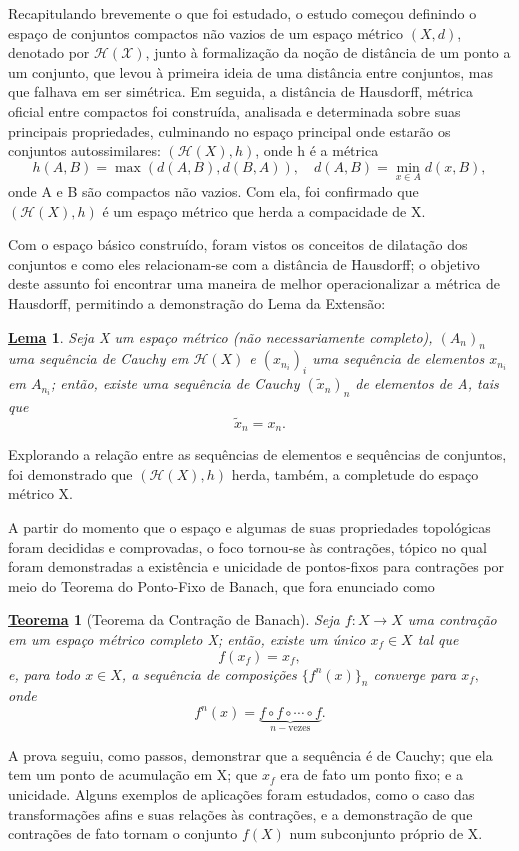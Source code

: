 \documentclass[12pt, a4paper]{article}
\newtheorem*{theorem*}{\underline{Teorema}}
\newtheorem*{lemma*}{\underline{Lema}}
\theoremstyle{definition}
\begin{document}
Recapitulando brevemente o que foi estudado, o estudo começou definindo o espaço de conjuntos compactos não vazios de um espaço métrico \((X, d)\), denotado por \(\mathcal{H(X)}\), junto à formalização da noção de distância de um ponto a um conjunto, que levou à primeira ideia de uma distância entre conjuntos, mas que falhava em ser simétrica.
Em seguida, a distância de Hausdorff, métrica oficial entre compactos foi construída, analisada e determinada sobre suas principais propriedades, culminando no espaço principal onde estarão os conjuntos autossimilares: \((\mathcal{H}(X), h)\), onde h é a métrica
\[
	h(A, B)=\max_{}(d(A, B), d(B, A)), \quad d(A, B) = \min\limits_{x\in A}d(x, B),
\]
onde A e B são compactos não vazios. Com ela, foi confirmado que \((\mathcal{H}(X), h)\) é um espaço métrico que herda a compacidade de X.

Com o espaço básico construído, foram vistos os conceitos de dilatação dos conjuntos e como eles relacionam-se com a distância de Hausdorff; o objetivo deste assunto foi encontrar uma maneira de melhor operacionalizar a métrica de Hausdorff, permitindo a demonstração do Lema da Extensão:
\begin{lemma*}
	Seja X um espaço métrico (não necessariamente completo), \((A_{n})_{n}\) uma sequência de Cauchy em \(\mathcal{H}(X)\) e \((x_{n_{i}})_{i}\) uma sequência de elementos \(x_{n_{i}}\) em \(A_{n_{i}}\); então, existe uma sequência de Cauchy \((\tilde{x}_{n})_{n}\) de elementos de A, tais que
	\[
		\tilde{x}_{n} = x_{n}.
	\]
\end{lemma*}
Explorando a relação entre as sequências de elementos e sequências de conjuntos, foi demonstrado que \((\mathcal{H}(X), h)\) herda, também, a completude do espaço métrico X.

A partir do momento que o espaço e algumas de suas propriedades topológicas foram decididas e comprovadas, o foco tornou-se às contrações, tópico no qual foram demonstradas a existência e unicidade de pontos-fixos para contrações por meio do Teorema do Ponto-Fixo de Banach, que fora enunciado como
\begin{theorem*}[Teorema da Contração de Banach]
	Seja \(f:X\rightarrow X\) uma contração em um espaço métrico completo X; então, existe um único \(x_{f}\in X\) tal que
	\[
		f(x_{f})=x_{f},
	\]
	e, para todo \(x\in X\), a sequência de composições \(\{f^{n}(x)\}_{n}\) converge para \(x_{f},\) onde
	\[
		f^{n}(x)= \underbrace{f\circ f\circ\cdots\circ f}_{n-\text{vezes}}.
	\]
\end{theorem*}
A prova seguiu, como passos, demonstrar que a sequência é de Cauchy; que ela tem um ponto de acumulação em X; que \(x_{f}\) era de fato um ponto fixo; e a unicidade.
Alguns exemplos de aplicações foram estudados, como o caso das transformações afins e suas relações às contrações, e a demonstração de que contrações de fato tornam o conjunto \(f(X)\) num subconjunto próprio de X.
\end{document}
